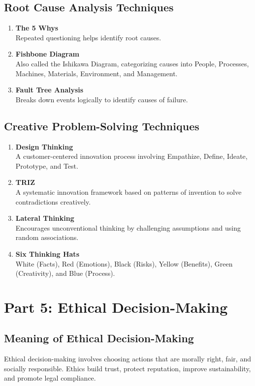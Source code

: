 \documentclass[12pt,a4paper]{article}
\begin{document}
\subsection*{Root Cause Analysis Techniques}

\begin{enumerate}
    \item \textbf{The 5 Whys} \\
    Repeated questioning helps identify root causes.
    \item \textbf{Fishbone Diagram} \\
    Also called the Ishikawa Diagram, categorizing causes into People, Processes, Machines, Materials, Environment, and Management.
    \item \textbf{Fault Tree Analysis} \\
    Breaks down events logically to identify causes of failure.
\end{enumerate}

\subsection*{Creative Problem-Solving Techniques}

\begin{enumerate}
    \item \textbf{Design Thinking} \\
    A customer-centered innovation process involving Empathize, Define, Ideate, Prototype, and Test.
    \item \textbf{TRIZ} \\
    A systematic innovation framework based on patterns of invention to solve contradictions creatively.
    \item \textbf{Lateral Thinking} \\
    Encourages unconventional thinking by challenging assumptions and using random associations.
    \item \textbf{Six Thinking Hats} \\
    White (Facts), Red (Emotions), Black (Risks), Yellow (Benefits), Green (Creativity), and Blue (Process).
\end{enumerate}

\section*{Part 5: Ethical Decision-Making}

\subsection*{Meaning of Ethical Decision-Making}
Ethical decision-making involves choosing actions that are morally right, fair, and socially responsible. Ethics build trust, protect reputation, improve sustainability, and promote legal compliance.
\end{document}
